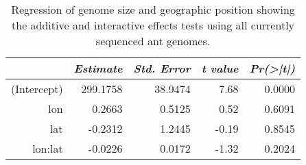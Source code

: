 \begin{table}[ht]
\centering
\begin{tabular}{rrrrr}
  \hline
 & {\emph{Estimate}} & {\emph{Std. Error}} & {\emph{t value}} & {\emph{Pr(>|t|)}} \\ 
  \hline
(Intercept) & 299.1758 & 38.9474 & 7.68 & 0.0000 \\ 
  lon & 0.2663 & 0.5125 & 0.52 & 0.6091 \\ 
  lat & -0.2312 & 1.2445 & -0.19 & 0.8545 \\ 
  lon:lat & -0.0226 & 0.0172 & -1.32 & 0.2024 \\ 
   \hline
\end{tabular}
\caption{Regression of genome size and geographic position showing the additive and interactive effects tests using all currently sequenced ant genomes.} 
\label{tab:sizegeo}
\end{table}
